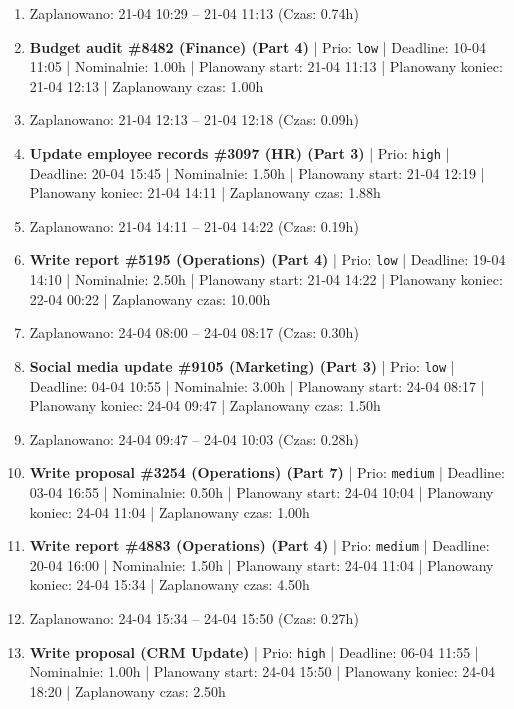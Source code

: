 {\begin{enumerate}
  \item [\textbf{PRZERWA}] Zaplanowano: 21-04 10:29 -- 21-04 11:13 (Czas: 0.74h)
  \item [\textbf{14694}] \textbf{Budget audit \#8482 (Finance) (Part 4)} | Prio: \texttt{low} | Deadline: 10-04 11:05 | Nominalnie: 1.00h | Planowany start: 21-04 11:13 | Planowany koniec: 21-04 12:13 | Zaplanowany czas: 1.00h
  \item [\textbf{PRZERWA}] Zaplanowano: 21-04 12:13 -- 21-04 12:18 (Czas: 0.09h)
  \item [\textbf{14621}] \textbf{Update employee records \#3097 (HR) (Part 3)} | Prio: \texttt{high} | Deadline: 20-04 15:45 | Nominalnie: 1.50h | Planowany start: 21-04 12:19 | Planowany koniec: 21-04 14:11 | Zaplanowany czas: 1.88h
  \item [\textbf{PRZERWA}] Zaplanowano: 21-04 14:11 -- 21-04 14:22 (Czas: 0.19h)
  \item [\textbf{14687}] \textbf{Write report \#5195 (Operations) (Part 4)} | Prio: \texttt{low} | Deadline: 19-04 14:10 | Nominalnie: 2.50h | Planowany start: 21-04 14:22 | Planowany koniec: 22-04 00:22 | Zaplanowany czas: 10.00h
  \item [\textbf{PRZERWA}] Zaplanowano: 24-04 08:00 -- 24-04 08:17 (Czas: 0.30h)
  \item [\textbf{14698}] \textbf{Social media update \#9105 (Marketing) (Part 3)} | Prio: \texttt{low} | Deadline: 04-04 10:55 | Nominalnie: 3.00h | Planowany start: 24-04 08:17 | Planowany koniec: 24-04 09:47 | Zaplanowany czas: 1.50h
  \item [\textbf{PRZERWA}] Zaplanowano: 24-04 09:47 -- 24-04 10:03 (Czas: 0.28h)
  \item [\textbf{14663}] \textbf{Write proposal \#3254 (Operations) (Part 7)} | Prio: \texttt{medium} | Deadline: 03-04 16:55 | Nominalnie: 0.50h | Planowany start: 24-04 10:04 | Planowany koniec: 24-04 11:04 | Zaplanowany czas: 1.00h
  \item [\textbf{14651}] \textbf{Write report \#4883 (Operations) (Part 4)} | Prio: \texttt{medium} | Deadline: 20-04 16:00 | Nominalnie: 1.50h | Planowany start: 24-04 11:04 | Planowany koniec: 24-04 15:34 | Zaplanowany czas: 4.50h
  \item [\textbf{PRZERWA}] Zaplanowano: 24-04 15:34 -- 24-04 15:50 (Czas: 0.27h)
  \item [\textbf{14629}] \textbf{Write proposal (CRM Update)} | Prio: \texttt{high} | Deadline: 06-04 11:55 | Nominalnie: 1.00h | Planowany start: 24-04 15:50 | Planowany koniec: 24-04 18:20 | Zaplanowany czas: 2.50h

\end{enumerate}}
